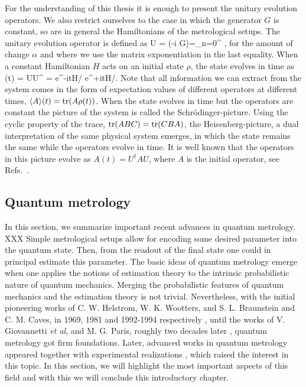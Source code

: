 For the understanding of this thesis it is enough to present the unitary evolution operators.
We also restrict ourselves to the case in which the generator $G$ is constant, so are in general the Hamiltonians of the metrological setups.
The unitary evolution operator is defined as
\be
  U = \exp(-i \alpha G)=\sum_{n=0}^{\infty} ,
\ee
for the amount of change $\alpha$ and where we use the matrix exponentiation in the last equality.
When a constant Hamiltonian $H$ acts on an initial state $\rho$, the state evolves in time as
\be
  \rho(t) = U\rho U^{\dagger} = e^{-itH/\hbar} \rho e^{+itH/\hbar}.
\ee
Note that all information we can extract from the system comes in the form of expectation values of different operators at different times, $\langle{A}\rangle(t) = \operatorname{tr}(A\rho(t))$.
When the state evolves in time but the operators are constant the picture of the system is called the Schr\"odinger-picture.
Using the cyclic property of the trace, $\operatorname{tr}(ABC) = \operatorname{tr}(CBA)$, the Heisenberg-picture, a dual interpretation of the same physical system emerges, in which the state remains the same while the operators evolve in time.
It is well known that the operators in this picture evolve as $A(t) = U^{\dagger} A U$, where $A$ is the initial operator, see Refs.~\cite{Cohen-Tannoudji1977, Sakurai2010}.

\subsection{Quantum metrology}
\label{sec:bg-quantum-metrology}

In this section, we summarize important recent advances in quantum metrology.
XXX Simple metrological setups allow for encoding some desired parameter into the quantum state.
Then, from the readout of the final state one could in principal estimate this parameter.
The basic ideas of quantum metrology emerge when one applies the notions of estimation theory to the intrinsic probabilistic nature of quantum mechanics.
Merging the probabilistic features of quantum mechanics and the estimation theory is not trivial.
Nevertheless, with the initial pioneering works of C. W. Helstrom, W. K. Wootters, and S. L. Braunstein and C. M. Caves, in 1969, 1981 and 1992-1994 respectively \cite{Helstrom1969, Wootters1981, Braunstein1992, Braunstein1994}, until the works of V. Giovannetti {\it et al}, and M. G. Paris, roughly two decades later \cite{Giovannetti2004, Paris2009}, quantum metrology got firm foundations.
Later, advanced works in quantum metrology appeared \cite{Hyllus2010, Hyllus2012, Hyllus2010a, Kolodynski2010, Kolodynski2013}
together with experimental realizations \cite{Behbood2013, Koschorreck2011, Luecke2011}, which raised the interest in this topic.
In this section, we will highlight the most important aspects of this field and with this we will conclude this introductory chapter.

